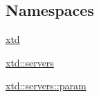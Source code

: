 \subsection*{Namespaces}
\begin{DoxyCompactItemize}
\item 
 \hyperlink{namespacextd}{xtd}
\item 
 \hyperlink{namespacextd_1_1servers}{xtd\+::servers}
\item 
 \hyperlink{namespacextd_1_1servers_1_1param}{xtd\+::servers\+::param}
\end{DoxyCompactItemize}
